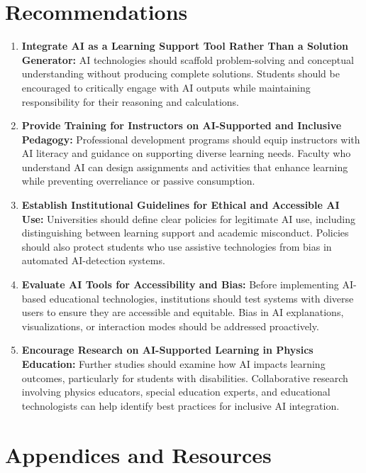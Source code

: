 \documentclass[]{aastex701}
\begin{document}
\section{Recommendations}
\label{sec:recommendations}
\begin{enumerate}
    \item \textbf{Integrate AI as a Learning Support Tool Rather Than a Solution Generator:}
    AI technologies should scaffold problem-solving and conceptual understanding without producing complete solutions. Students should be encouraged to critically engage with AI outputs while maintaining responsibility for their reasoning and calculations.

    \item \textbf{Provide Training for Instructors on AI-Supported and Inclusive Pedagogy:}
    Professional development programs should equip instructors with AI literacy and guidance on supporting diverse learning needs. Faculty who understand AI can design assignments and activities that enhance learning while preventing overreliance or passive consumption.

    \item \textbf{Establish Institutional Guidelines for Ethical and Accessible AI Use:}
    Universities should define clear policies for legitimate AI use, including distinguishing between learning support and academic misconduct. Policies should also protect students who use assistive technologies from bias in automated AI-detection systems.

    \item \textbf{Evaluate AI Tools for Accessibility and Bias:}
    Before implementing AI-based educational technologies, institutions should test systems with diverse users to ensure they are accessible and equitable. Bias in AI explanations, visualizations, or interaction modes should be addressed proactively.

    \item \textbf{Encourage Research on AI-Supported Learning in Physics Education:}
    Further studies should examine how AI impacts learning outcomes, particularly for students with disabilities. Collaborative research involving physics educators, special education experts, and educational technologists can help identify best practices for inclusive AI integration.
\end{enumerate}

\printbibliography

\appendix

\section{Appendices and Resources}
\end{document}
